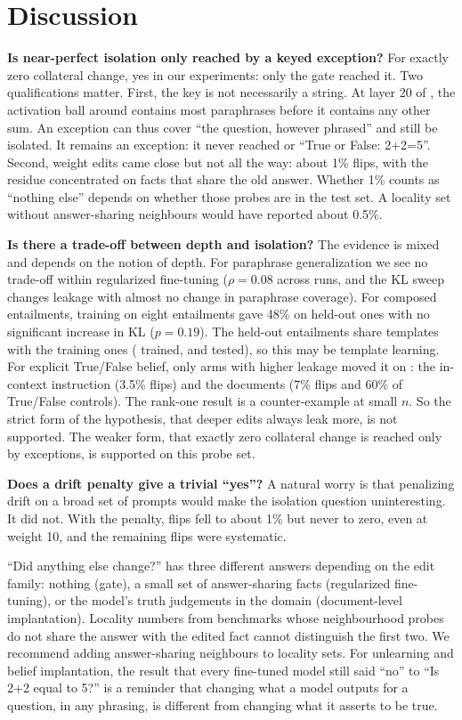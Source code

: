 \section{Discussion}
\label{sec:discussion}

{\bf Is near-perfect isolation only reached by a keyed exception?}
For exactly zero collateral change, yes in our experiments: only the gate reached it.
Two qualifications matter.
First, the key is not necessarily a string.
At layer 20 of \llamashort, the activation ball around  contains most paraphrases before it contains any other sum.
An exception can thus cover ``the question, however phrased'' and still be isolated.
It remains an exception: it never reached  or ``True or False: 2+2=5''.
Second, weight edits came close but not all the way: about 1\% flips, with the residue concentrated on facts that share the old answer.
Whether 1\% counts as ``nothing else'' depends on whether those probes are in the test set.
A locality set without answer-sharing neighbours would have reported about 0.5\%.

{\bf Is there a trade-off between depth and isolation?}
The evidence is mixed and depends on the notion of depth.
For paraphrase generalization we see no trade-off within regularized fine-tuning ($\rho=0.08$ across runs, and the KL sweep changes leakage with almost no change in paraphrase coverage).
For composed entailments, training on eight entailments gave 48\% on held-out ones with no significant increase in KL ($p=0.19$).
The held-out entailments share templates with the training ones ( trained,  and  tested), so this may be template learning.
For explicit True/False belief, only arms with higher leakage moved it on \llamashort: the in-context instruction (3.5\% flips) and the documents (7\% flips and 60\% of True/False controls).
The \qwenshort rank-one result is a counter-example at small $n$.
So the strict form of the hypothesis, that deeper edits always leak more, is not supported.
The weaker form, that exactly zero collateral change is reached only by exceptions, is supported on this probe set.

{\bf Does a drift penalty give a trivial ``yes''?}
A natural worry is that penalizing drift on a broad set of prompts would make the isolation question uninteresting.
It did not.
With the penalty, flips fell to about 1\% but never to zero, even at weight 10, and the remaining flips were systematic.

``Did anything else change?'' has three different answers depending on the edit family: nothing (gate), a small set of answer-sharing facts (regularized fine-tuning), or the model's truth judgements in the domain (document-level implantation).
Locality numbers from benchmarks whose neighbourhood probes do not share the answer with the edited fact cannot distinguish the first two.
We recommend adding answer-sharing neighbours to locality sets.
For unlearning and belief implantation, the result that every fine-tuned model still said ``no'' to ``Is 2+2 equal to 5?'' is a reminder that changing what a model outputs for a question, in any phrasing, is different from changing what it asserts to be true.

